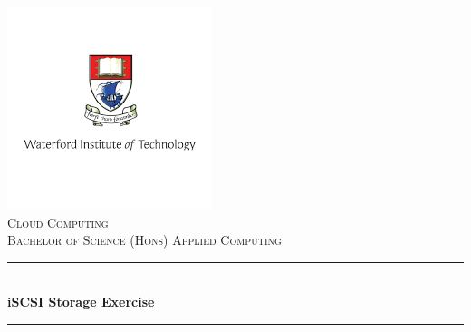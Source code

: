 \begin{titlepage}

\newcommand{\HRule}{\rule{\linewidth}{0.5mm}} %

\center %


\includegraphics{logo.png}\\ %
 
 


\textsc{\Large Cloud Computing}\\[0.5cm] %
\textsc{\large Bachelor of Science (Hons) Applied Computing }\\[0.5cm] %


\HRule \\[0.4cm]
{ \huge \bfseries iSCSI Storage Exercise}\\[0.4cm] %
\HRule \\[1.5cm]
 




\end{titlepage}

